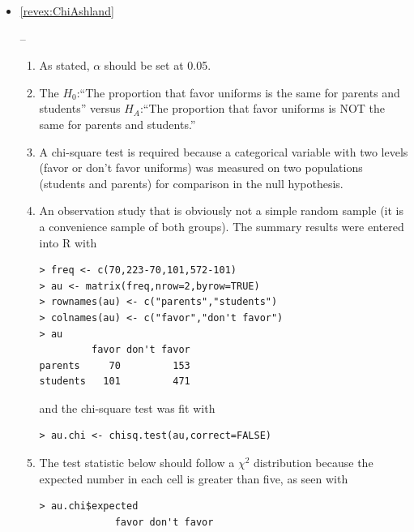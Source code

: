 \documentclass[10pt,openany]{book}\usepackage[]{graphicx}\usepackage[]{color}
\makeatletter
\newenvironment{kframe}{%
 \def\at@end@of@kframe{}%
 \ifinner\ifhmode%
  \def\at@end@of@kframe{\end{minipage}}%
  \begin{minipage}{\columnwidth}%
 \fi\fi%
 \def\FrameCommand##1{\hskip\@totalleftmargin \hskip-\fboxsep
 \colorbox{shadecolor}{##1}\hskip-\fboxsep
     \hskip-\linewidth \hskip-\@totalleftmargin \hskip\columnwidth}%
 \MakeFramed {\advance\hsize-\width
   \@totalleftmargin\z@ \linewidth\hsize
   \@setminipage}}%
 {\par\unskip\endMakeFramed%
 \at@end@of@kframe}
\newenvironment{knitrout}{}{} %
\makeatother
\begin{document}
\begin{itemize}
\begin{enumerate}
    \end{enumerate}
  \item \hypertarget{ans:ChiAshland}{\ref{revex:ChiAshland}} --
    \begin{enumerate}
      \item As stated, $\alpha$ should be set at 0.05.
      \item The $H_{0}$:``The proportion that favor uniforms is the same for parents and students'' versus $H_{A}$:``The proportion that favor uniforms is NOT the same for parents and students.''
      \item A chi-square test is required because a categorical variable with two levels (favor or don't favor uniforms) was measured on two populations (students and parents) for comparison in the null hypothesis.
      \item An observation study that is obviously not a simple random sample (it is a convenience sample of both groups).  The summary results were entered into R with
\begin{knitrout}
\color{fgcolor}\begin{kframe}
\begin{verbatim}
> freq <- c(70,223-70,101,572-101)
> au <- matrix(freq,nrow=2,byrow=TRUE)
> rownames(au) <- c("parents","students")
> colnames(au) <- c("favor","don't favor")
> au
         favor don't favor
parents     70         153
students   101         471
\end{verbatim}
\end{kframe}
\end{knitrout}
and the chi-square test was fit with
\begin{knitrout}
\color{fgcolor}\begin{kframe}
\begin{verbatim}
> au.chi <- chisq.test(au,correct=FALSE)
\end{verbatim}
\end{kframe}
\end{knitrout}
      \item The test statistic below should follow a $\chi^{2}$ distribution because the expected number in each cell is greater than five, as seen with
\begin{knitrout}
\color{fgcolor}\begin{kframe}
\begin{verbatim}
> au.chi$expected
             favor don't favor

\end{verbatim}
\end{kframe}
\end{knitrout}
\end{enumerate}
\end{itemize}
\end{document}
